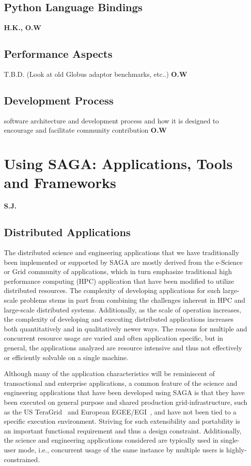 \documentclass[a4paper,10pt]{article}
\begin{document}
 \subsection{Python Language Bindings}
 \textbf{H.K., O.W}
 
 
 \subsection{Performance Aspects}
 T.B.D. (Look at old Globus adaptor benchmarks, etc..) \textbf{O.W}

 \subsection{Development Process}
 software architecture and development process and how it is designed to encourage and facilitate community contribution \textbf{O.W}


\section{Using SAGA: Applications, Tools and Frameworks} \textbf{S.J.}

\subsection{Distributed Applications}

 The distributed science and engineering applications that we have
 traditionally been implemented or supported by SAGA are mostly
 derived from the e-Science or Grid community of applications, which
 in turn emphasize traditional high performance computing (HPC)
 application that have been modified to utilize distributed resources.
 The complexity of developing applications for such large-scale
 problems stems in part from combining the challenges inherent in HPC
 and large-scale distributed systems.  Additionally, as the scale of
 operation increases, the complexity of developing and executing
 distributed applications increases both quantitatively and in
 qualitatively newer ways.  The reasons for multiple and concurrent
 resource usage are varied and often application specific, but in
 general, the applications analyzed are resource intensive and thus
 not effectively or efficiently solvable on a single machine.

 Although many of the application characteristics will be reminiscent
 of transactional and enterprise applications, a common feature of the
 science and engineering applications that have been developed using
 SAGA is that they have been executed on general purpose and shared
 production grid-infrastructure, such as the US
 TeraGrid~\cite{teragrid} and European EGEE/EGI~\cite{egi}, and have
 not been tied to a specific execution environment. Striving for such
 extensibility and portability is an important functional requirement
 and thus a design constraint. Additionally, the science and
 engineering applications considered are typically used in single-user
 mode, i.e., concurrent usage of the same instance by multiple users
 is highly-constrained.
\end{document}
